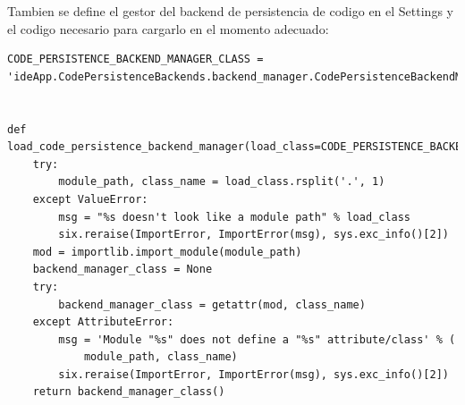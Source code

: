 Tambien se define el gestor del backend de persistencia de codigo en el Settings y el codigo necesario para cargarlo en el momento adecuado:
\lstset{language=Python}
\begin{lstlisting}[breaklines]
CODE_PERSISTENCE_BACKEND_MANAGER_CLASS = 'ideApp.CodePersistenceBackends.backend_manager.CodePersistenceBackendManager'


def load_code_persistence_backend_manager(load_class=CODE_PERSISTENCE_BACKEND_MANAGER_CLASS):
    try:
        module_path, class_name = load_class.rsplit('.', 1)
    except ValueError:
        msg = "%s doesn't look like a module path" % load_class
        six.reraise(ImportError, ImportError(msg), sys.exc_info()[2])
    mod = importlib.import_module(module_path)
    backend_manager_class = None
    try:
        backend_manager_class = getattr(mod, class_name)
    except AttributeError:
        msg = 'Module "%s" does not define a "%s" attribute/class' % (
            module_path, class_name)
        six.reraise(ImportError, ImportError(msg), sys.exc_info()[2])
    return backend_manager_class()

\end{lstlisting}
\lstset{language=Bash}

